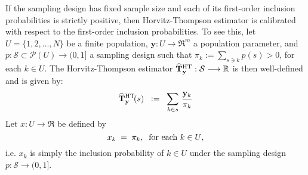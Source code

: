 \documentclass{article}
\begin{document}
\begin{example}
\mbox{}
\vskip 0.1cm
\noindent
If the sampling design has fixed sample size and each of its first-order inclusion probabilities is strictly positive, then Horvitz-Thompson estimator is calibrated with respect to the first-order inclusion probabilities.
\vskip 0.2cm
\noindent
To see this, let $U = \{1,2,\ldots,N\}$ be a finite population,
$\mathbf{y} : U \longrightarrow \Re^{m}$ a population parameter, and
$p : \mathcal{S}\subset\mathcal{P}(U) \longrightarrow (0,1]$ a sampling design
such that $\pi_{k} := \sum_{s \ni k}p(s) > 0$, for each $k \in U$.
The Horvitz-Thompson estimator
$\widehat{\mathbf{T}}^{\textnormal{HT}}_{\mathbf{y}} : \mathcal{S} \longrightarrow \Re$
is then well-defined and is given by:
\begin{equation*}
\widehat{\mathbf{T}}^{\textnormal{HT}}_{\mathbf{y}}\!(s)
\;\; := \;\; \sum_{k \in s}\,\dfrac{\mathbf{y}_{k}}{\pi_{k}}
\end{equation*}
Let $x : U \longrightarrow \Re$ be defined by
\begin{equation*}
x_{k} \; = \; \pi_{k},
\;\;\textnormal{for each $k \in U$},
\end{equation*}
i.e. $x_{k}$ is simply the inclusion probability of $k \in U$
under the sampling design $p : \mathcal{S} \longrightarrow (0,1]$.


\end{example}
\end{document}
